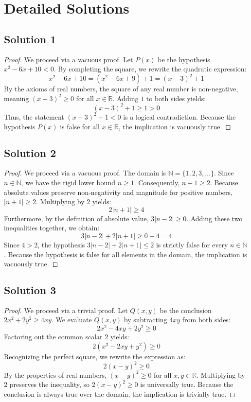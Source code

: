 \documentclass[12pt]{article}
\begin{document}
\section{Detailed Solutions}
\label{sec:solutions}

\subsection*{Solution 1}
\begin{proof}
We proceed via a vacuous proof. Let $P(x)$ be the hypothesis $x^2 - 6x + 10 < 0$. By completing the square, we rewrite the quadratic expression:
\[ x^2 - 6x + 10 = (x^2 - 6x + 9) + 1 = (x-3)^2 + 1 \]
By the axioms of real numbers, the square of any real number is non-negative, meaning $(x-3)^2 \ge 0$ for all $x \in \mathbb{R}$. Adding $1$ to both sides yields:
\[ (x-3)^2 + 1 \ge 1 > 0 \]
Thus, the statement $(x-3)^2 + 1 < 0$ is a logical contradiction. Because the hypothesis $P(x)$ is false for all $x \in \mathbb{R}$, the implication is vacuously true.
\end{proof}

\subsection*{Solution 2}
\begin{proof}
We proceed via a vacuous proof. The domain is $\mathbb{N} = \{1, 2, 3, \dots\}$. Since $n \in \mathbb{N}$, we have the rigid lower bound $n \ge 1$. Consequently, $n + 1 \ge 2$. Because absolute values preserve non-negativity and magnitude for positive numbers, $|n + 1| \ge 2$. Multiplying by $2$ yields:
\[ 2|n + 1| \ge 4 \]
Furthermore, by the definition of absolute value, $3|n - 2| \ge 0$. Adding these two inequalities together, we obtain:
\[ 3|n - 2| + 2|n + 1| \ge 0 + 4 = 4 \]
Since $4 > 2$, the hypothesis $3|n - 2| + 2|n + 1| \le 2$ is strictly false for every $n \in \mathbb{N}$. Because the hypothesis is false for all elements in the domain, the implication is vacuously true.
\end{proof}

\subsection*{Solution 3}
\begin{proof}
We proceed via a trivial proof. Let $Q(x,y)$ be the conclusion $2x^2 + 2y^2 \ge 4xy$. We evaluate $Q(x,y)$ by subtracting $4xy$ from both sides:
\[ 2x^2 - 4xy + 2y^2 \ge 0 \]
Factoring out the common scalar $2$ yields:
\[ 2(x^2 - 2xy + y^2) \ge 0 \]
Recognizing the perfect square, we rewrite the expression as:
\[ 2(x-y)^2 \ge 0 \]
By the properties of real numbers, $(x-y)^2 \ge 0$ for all $x, y \in \mathbb{R}$. Multiplying by $2$ preserves the inequality, so $2(x-y)^2 \ge 0$ is universally true. Because the conclusion is always true over the domain, the implication is trivially true.
\end{proof}
\end{document}
